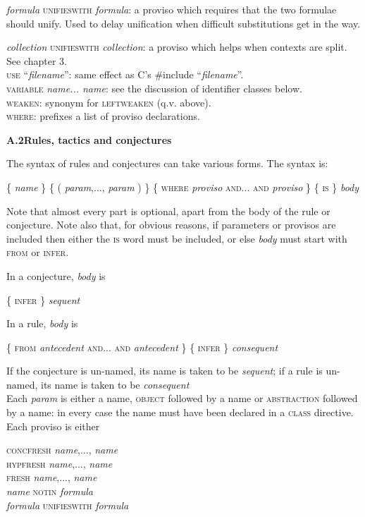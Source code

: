 \textit{formula} \textsc{unifieswith} \textit{formula}: a proviso which requires that the two formulae should unify. Used to delay unification when difficult substitutions get in the way.


\textit{collection} \textsc{unifieswith} \textit{collection}: a proviso which helps when contexts are split. See chapter 3.\\
\textsc{use} ``\textit{filename}'': same effect as C's \#include ``\textit{filename}''.\\
\textsc{variable} \textit{name... name}: see the discussion of identifier classes below.\\
\textsc{weaken}: synonym for \textsc{leftweaken} (q.v. above).\\
\textsc{where}: prefixes a list of proviso declarations.
 
\textbf{{\large A.2\tab Rules, tactics and conjectures}}


The syntax of rules and conjectures can take various forms. The syntax is:


\{ \textit{name} \} \{ ( \textit{param},..., \textit{param} ) \} \{ \textsc{where} \textit{proviso} \textsc{and... and} \textit{proviso} \} \{ \textsc{is} \} \textit{body}


Note that almost every part is optional, apart from the body of the rule or conjecture. Note also that, for obvious reasons, if parameters or provisos are included then either the \textsc{is} word must be included, or else \textit{body} must start with \textsc{from} or \textsc{infer}.


In a conjecture, \textit{body} is


\{ \textsc{infer \}} \textit{sequent}


In a rule, \textit{body} is


\{ \textsc{from} \textit{antecedent} \textsc{and... and} \textit{antecedent} \} \{ \textsc{infer \}} \textit{consequent}


If the conjecture is un-named, its name is taken to be \textit{sequent}; if a rule is un-named, its name is taken to be \textit{consequent}\\
Each \textit{param} is either a name, \textsc{object} followed by a name or \textsc{abstraction} followed by a name: in every case the name must have been declared in a \textsc{class} directive. Each proviso is either

\textsc{concfresh} \textit{name},..., \textit{name}\\
\textsc{hypfresh} \textit{name},..., \textit{name}\\
\textsc{fresh} \textit{name},..., \textit{name}\\
\textit{name} \textsc{notin} \textit{formula}\\
\textit{formula} \textsc{unifieswith} \textit{formula}


